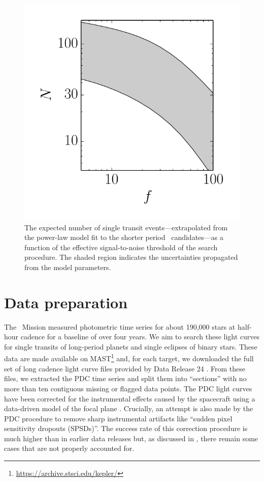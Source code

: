 \begin{figure}[p]
\begin{center}
\includegraphics{figures/peerless/predict.pdf}
\end{center}
\caption{%
The expected number of single transit events---extrapolated from the
\citet{Dong:2013} power-law model fit to the shorter period \kepler\
candidates---as a function of the effective signal-to-noise threshold of the
search procedure.
The shaded region indicates the uncertainties propagated from the model
parameters.
}
\end{figure}


\section{Data preparation}

The \kepler\ Mission measured photometric time series for about 190,000 stars
at half-hour cadence for a baseline of over four years.
We aim to search these light curves for single transits of long-period planets
and single eclipses of binary stars.
These data are made available on
MAST\footnote{\url{https://archive.stsci.edu/kepler/}} and, for each target,
we downloaded the full set of long cadence light curve files provided by Data
Release 24 \citep{Thompson:2015}.
From these files, we extracted the PDC time series and split them into
``sections'' with no more than ten contiguous missing or flagged data points.
The PDC light curves have been corrected for the instrumental effects caused
by the spacecraft using a data-driven model of the focal plane
\citep{Stumpe:2012, Smith:2012}.
Crucially, an attempt is also made by the PDC procedure to remove sharp
instrumental artifacts like ``sudden pixel sensitivity dropouts (SPSDs)''.
The success rate of this correction procedure is much higher than in earlier
data releases but, as discussed in \sect{demo}, there remain some cases that
are not properly accounted for.

